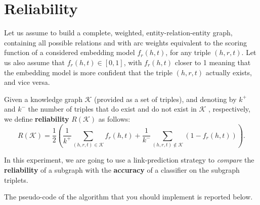 \documentclass[a4paper,9pt]{article}
\begin{document}

\section{Reliability}

Let us assume to build a complete, weighted, entity-relation-entity graph, containing all possible relations and with arc weights equivalent to the scoring function of a considered embedding model $f_r(h,t)$, for any triple $(h,r,t)$.
Let us also assume that $f_r(h,t) \in [0,1]$, with $f_r(h,t)$ closer to 1 meaning that the embedding model is more confident that the triple $(h,r,t)$ actually exists, and vice versa. 

Given a knowledge graph $\mathcal{K}$ (provided as a set of triples), and denoting by $k^+$ and $k^-$ the number of triples that do exist and do not exist in $\mathcal{K}$ , respectively,
we define \textbf{reliability} $R(\mathcal{K})$ as follows: 
$$
R(\mathcal{K}) = \frac{1}{2} \left ( \frac{1}{k^+} \sum_{(h,r,t) \in \mathcal{K}} f_r(h,t) + \frac{1}{k^-} \sum_{(h,r,t) \not \in \mathcal{K}} (1 - f_r(h,t)) \right ).
$$

In this experiment, we are going to use a link-prediction strategy to \emph{compare} the \textbf{reliability} of a subgraph with the \textbf{accuracy} of a classifier on the subgraph triplets. 

The pseudo-code of the algorithm that you should implement is reported below. 
\end{document}
